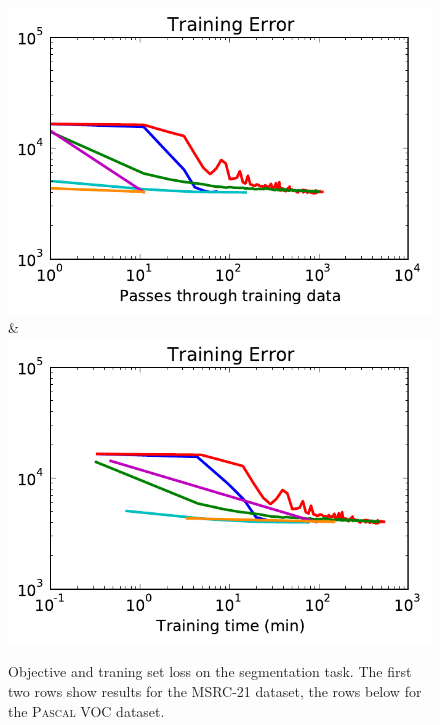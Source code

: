 \begin{figure}
\begin{tabu}
    \includegraphics[width=\linewidth]{evaluation/images/pascal_loss}&%
    \includegraphics[width=\linewidth]{evaluation/images/pascal_time_loss}
    \end{tabu}
\caption{%
    Objective and traning set loss on the segmentation task. The first two rows
    show results for the MSRC-21 dataset, the rows below for the \textsc{Pascal
    VOC} dataset.
}
\end{figure}

